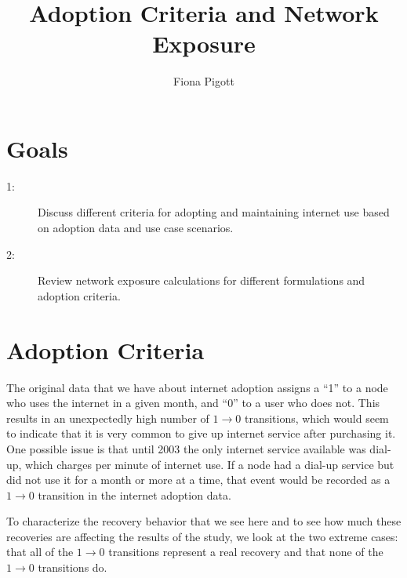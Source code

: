 \documentclass[12pt]{article}
\title{Adoption Criteria and Network Exposure}
\author{Fiona Pigott}
\begin{document}
\maketitle

\section*{Goals}
\begin{description}
\item[1:] Discuss different criteria for adopting and maintaining internet use based on adoption data and use case scenarios.
\item[2:] Review network exposure calculations for different formulations and adoption criteria.
\end{description}

\section{Adoption Criteria}

The original data that we have about internet adoption assigns a ``1'' to a node who uses the internet in a given month, and  ``0'' to a user who does not. This results in an unexpectedly high number of \(1 \rightarrow 0\) transitions, which would seem to indicate that it is very common to give up internet service after purchasing it. One possible issue is that until 2003 the only internet service available was dial-up, which charges per minute of internet use. If a node had a dial-up service but did not use it for a month or more at a time, that event would be recorded as a \(1 \rightarrow 0\) transition in the internet adoption data. 

To characterize the recovery behavior that we see here and to see how much these recoveries are affecting the results of the study, we look at the two extreme cases: that all of the \(1 \rightarrow 0\) transitions represent a real recovery and that none of the \(1 \rightarrow 0\) transitions do.
\newpage
\end{document}
